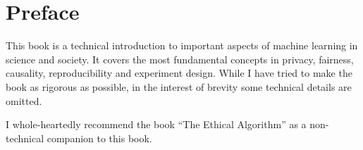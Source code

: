 \chapter*{Preface}

This book is a technical introduction to important aspects of machine learning in science and society. It covers the most fundamental concepts in privacy, fairness, causality, reproducibility and experiment design. While I have tried to make the book as rigorous as possible, in the interest of brevity some technical details are omitted.

I whole-heartedly recommend the book ``The Ethical Algorithm'' as a non-technical companion to this book.
